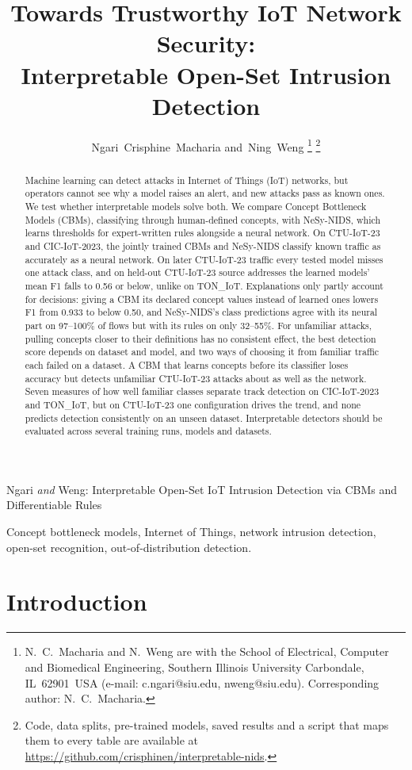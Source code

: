 \documentclass[journal]{IEEEtran}
\title{Towards Trustworthy IoT Network Security:\\
  Interpretable Open-Set Intrusion Detection}
\author{Ngari~Crisphine~Macharia and~Ning~Weng%
  \thanks{N.~C.~Macharia and N.~Weng are with the School of Electrical,
    Computer and Biomedical Engineering, Southern Illinois University
    Carbondale, IL~62901~USA
    (e-mail: c.ngari@siu.edu, nweng@siu.edu).
    Corresponding author: N.~C.~Macharia.}%
  \thanks{Code, data splits, pre-trained models, saved results and a script that
    maps them to every table are available at
    \url{https://github.com/crisphinen/interpretable-nids}.}%
}
\begin{document}

%
{Ngari \MakeLowercase{\textit{and}} Weng: Interpretable Open-Set IoT Intrusion Detection via CBMs and Differentiable Rules}

\maketitle

\begin{abstract}
Machine learning can detect attacks in Internet of Things (IoT) networks, but operators cannot see why a model raises an alert, and new attacks pass as known ones. We test whether interpretable models solve both. We compare Concept Bottleneck Models (CBMs), classifying through human-defined concepts, with NeSy-NIDS, which learns thresholds for expert-written rules alongside a neural network. On CTU-IoT-23 and CIC-IoT-2023, the jointly trained CBMs and NeSy-NIDS classify known traffic as accurately as a neural network. On later CTU-IoT-23 traffic every tested model misses one attack class, and on held-out CTU-IoT-23 source addresses the learned models' mean F1 falls to 0.56 or below, unlike on TON\_IoT. Explanations only partly account for decisions: giving a CBM its declared concept values instead of learned ones lowers F1 from 0.933 to below 0.50, and NeSy-NIDS's class predictions agree with its neural part on 97--100\% of flows but with its rules on only 32--55\%. For unfamiliar attacks, pulling concepts closer to their definitions has no consistent effect, the best detection score depends on dataset and model, and two ways of choosing it from familiar traffic each failed on a dataset. A CBM that learns concepts before its classifier loses accuracy but detects unfamiliar CTU-IoT-23 attacks about as well as the network. Seven measures of how well familiar classes separate track detection on CIC-IoT-2023 and TON\_IoT, but on CTU-IoT-23 one configuration drives the trend, and none predicts detection consistently on an unseen dataset. Interpretable detectors should be evaluated across several training runs, models and datasets.
\end{abstract}

\begin{IEEEkeywords}
Concept bottleneck models, Internet of Things, network intrusion detection, open-set recognition, out-of-distribution detection.
\end{IEEEkeywords}

\section{Introduction}\label{sec:intro}
\end{document}
